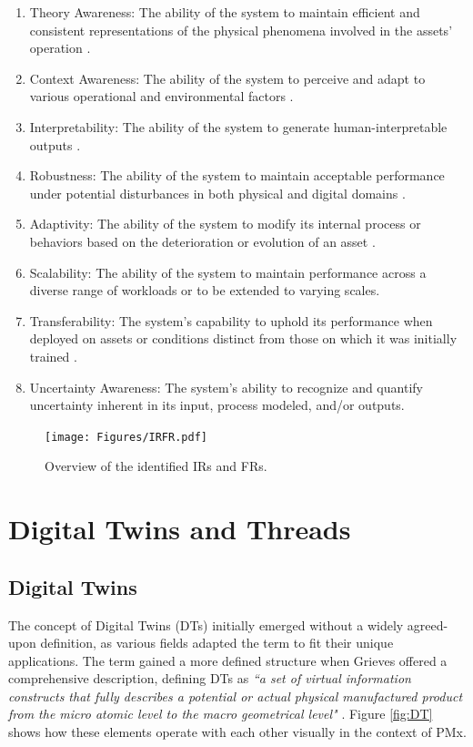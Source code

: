 \documentclass[runningheads]{llncs}
\begin{document}
\begin{enumerate}
    \item Theory Awareness: The ability of the system to maintain efficient and consistent representations of the physical phenomena involved in the assets' operation \cite{lana2021data}.
    \item Context Awareness: The ability of the system to perceive and adapt to various operational and environmental factors \cite{GALAR2015137}.
    \item Interpretability: The ability of the system to generate human-interpretable outputs \cite{vollert2021interpretable}. 
    \item Robustness: The ability of the system to maintain acceptable performance under potential disturbances in both physical and digital domains \cite{lana2021data}.
    \item Adaptivity: The ability of the system to modify its internal process or behaviors based on the deterioration or evolution of an asset \cite{lana2021data}.
    \item Scalability: The ability of the system to maintain performance across a diverse range of workloads or to be extended to varying scales.
    \item Transferability: The system's capability to uphold its performance when deployed on assets or conditions distinct from those on which it was initially trained \cite{lana2021data}.
    \item Uncertainty Awareness: The system's ability to recognize and quantify uncertainty inherent in its input, process modeled, and/or outputs.
\end{enumerate}

\begin{figure}[h]
    \centering
    \texttt{[image: Figures/IRFR.pdf]}
    \caption{Overview of the identified IRs and FRs.}
    \label{fig:IRFR}
\end{figure}







\section{Digital Twins and Threads}
\label{sec:DTT}
\subsection{Digital Twins}
\label{DTD}
The concept of Digital Twins (DTs) initially emerged without a widely agreed-upon definition, as various fields adapted the term to fit their unique applications. The term gained a more defined structure when Grieves offered a comprehensive description, defining DTs as \textit{``a set of virtual information constructs that fully describes a potential or actual physical manufactured product from the micro atomic level to the macro geometrical level"} \cite{grieves2017digital}. Figure \ref{fig:DT} shows how these elements operate with each other visually in the context of PMx.
\end{document}

